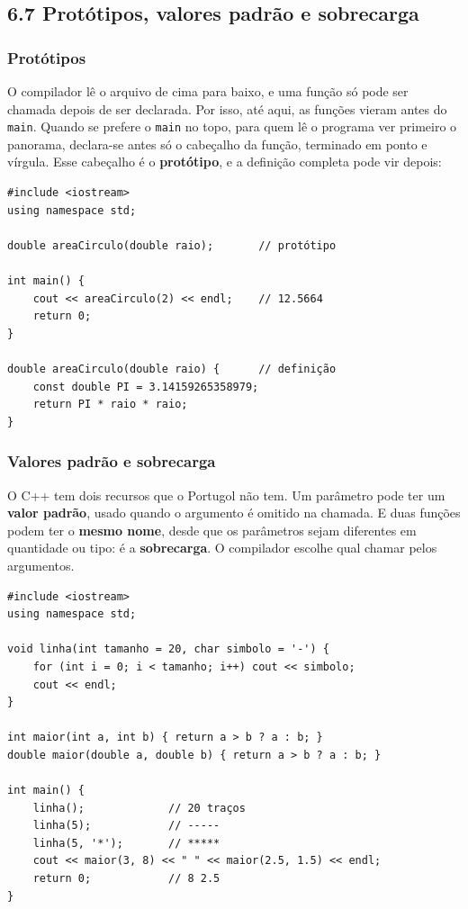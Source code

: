 \subsection{6.7 Protótipos, valores padrão e sobrecarga}

\subsubsection{Protótipos}

O compilador lê o arquivo de cima para baixo, e uma função só pode ser chamada depois de ser declarada. Por isso, até aqui, as funções vieram antes do \texttt{main}. Quando se prefere o \texttt{main} no topo, para quem lê o programa ver primeiro o panorama, declara-se antes só o cabeçalho da função, terminado em ponto e vírgula. Esse cabeçalho é o \textbf{protótipo}, e a definição completa pode vir depois:

\begin{codigo}
\begin{Verbatim}[breaklines=true, breaksymbolleft={}, fontsize=\footnotesize]
#include <iostream>
using namespace std;

double areaCirculo(double raio);       // protótipo

int main() {
    cout << areaCirculo(2) << endl;    // 12.5664
    return 0;
}

double areaCirculo(double raio) {      // definição
    const double PI = 3.14159265358979;
    return PI * raio * raio;
}
\end{Verbatim}
\end{codigo}

\subsubsection{Valores padrão e sobrecarga}

O C++ tem dois recursos que o Portugol não tem. Um parâmetro pode ter um \textbf{valor padrão}, usado quando o argumento é omitido na chamada. E duas funções podem ter o \textbf{mesmo nome}, desde que os parâmetros sejam diferentes em quantidade ou tipo: é a \textbf{sobrecarga}. O compilador escolhe qual chamar pelos argumentos.

\begin{codigo}
\begin{Verbatim}[breaklines=true, breaksymbolleft={}, fontsize=\footnotesize]
#include <iostream>
using namespace std;

void linha(int tamanho = 20, char simbolo = '-') {
    for (int i = 0; i < tamanho; i++) cout << simbolo;
    cout << endl;
}

int maior(int a, int b) { return a > b ? a : b; }
double maior(double a, double b) { return a > b ? a : b; }

int main() {
    linha();             // 20 traços
    linha(5);            // -----
    linha(5, '*');       // *****
    cout << maior(3, 8) << " " << maior(2.5, 1.5) << endl;
    return 0;            // 8 2.5
}
\end{Verbatim}
\end{codigo}

